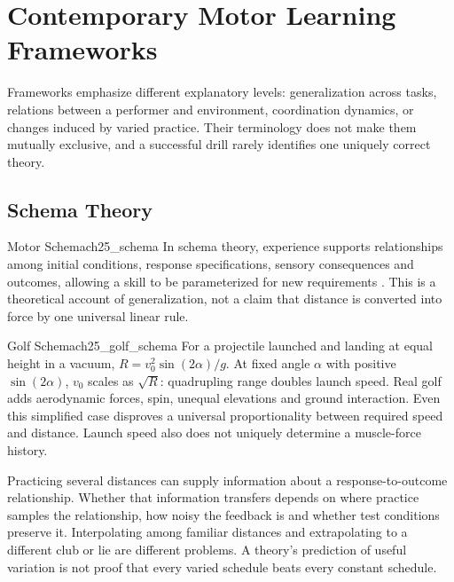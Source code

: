 \section{Contemporary Motor Learning Frameworks}
\label{sec:ch25_learning_frameworks}

Frameworks emphasize different explanatory levels: generalization across tasks, relations between a performer and environment, coordination dynamics, or changes induced by varied practice. Their terminology does not make them mutually exclusive, and a successful drill rarely identifies one uniquely correct theory.

\begin{samepage}
\subsection{Schema Theory}
\label{subsec:ch25_schema}

\begin{definition}[unbreakable]{Motor Schema}{ch25_schema}
In schema theory, experience supports relationships among initial conditions, response specifications, sensory consequences and outcomes, allowing a skill to be parameterized for new requirements \citep{schmidt1975schema}. This is a theoretical account of generalization, not a claim that distance is converted into force by one universal linear rule.
\end{definition}
\end{samepage}

\begin{example}{Golf Schema}{ch25_golf_schema}
For a projectile launched and landing at equal height in a vacuum, $R=v_0^2\sin(2\alpha)/g$. At fixed angle $\alpha$ with positive $\sin(2\alpha)$, $v_0$ scales as $\sqrt{R}$: quadrupling range doubles launch speed. Real golf adds aerodynamic forces, spin, unequal elevations and ground interaction. Even this simplified case disproves a universal proportionality between required speed and distance. Launch speed also does not uniquely determine a muscle-force history.
\end{example}

Practicing several distances can supply information about a response-to-outcome relationship. Whether that information transfers depends on where practice samples the relationship, how noisy the feedback is and whether test conditions preserve it. Interpolating among familiar distances and extrapolating to a different club or lie are different problems. A theory's prediction of useful variation is not proof that every varied schedule beats every constant schedule.

